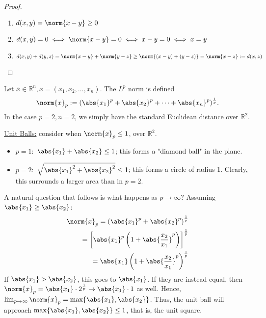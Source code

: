 \begin{proof}
    \begin{enumerate}
        \item $d(x,y) = \norm{x - y} \geq 0$
        \item $d(x, y) = 0 \iff \norm{x - y} = 0 \iff x - y = 0 \iff x = y$
        \item $d(x, y) + d(y, z) = \norm{x - y} + \norm{y - z} \geq \norm{(x - y) + (y-z)} = \norm{x - z} := d(x, z)$
    \end{enumerate}
\end{proof}

\begin{example}
    Let $\overline{x} \in \mathbb{R}^n, x = (x_1, x_2, \dots, x_n)$. The $L^p$ norm is defined \[
    \norm{x}_p := (\abs{x_1}^p + \abs{x_2}^p + \cdots + \abs{x_n}^p)^{\frac{1}{p}}.    
    \]
    In the case $p = 2, n = 2$, we simply have the standard Euclidean distance over $\mathbb{R}^2$.

    \underline{Unit Balls:} consider when $\norm{x}_p \leq 1$, over $\mathbb{R}^2$.
    \begin{itemize}
        \item $p = 1:$ $\abs{x_1} + \abs{x_2} \leq 1$; this forms a "diamond ball" in the plane.
        \item $p = 2:$ $\sqrt{\abs{x_1}^{2}+\abs{x_2}^2} \leq 1$; this forms a circle of radius 1. Clearly, this surrounds a larger area than in $p =2$.
    \end{itemize}
    A natural question that follows is what happens as $p \to \infty$? Assuming $\abs{x_1} \geq \abs{x_2}$:
    \begin{align*}
        \norm{x}_p = \left(\abs{x_1}^p + \abs{x_2}^p\right)^{\frac{1}{p}}\\
        = \left[\abs{x_1}^p\left(1 + \abs{\frac{x_2}{x_1}}^p\right)\right]^{\frac{1}{p}}\\
        = \abs{x_1}\left(1 + \abs{\frac{x_2}{x_1}}^p\right)^{\frac{1}{p}}
    \end{align*}
    If $\abs{x_1} > \abs{x_2}$, this goes to $\abs{x_1}$. If they are instead equal, then $\norm{x}_p = \abs{x_1}\cdot 2^{\frac{1}{p}} \to \abs{x_1} \cdot 1$ as well. Hence, $\lim_{p \to \infty} \norm{x}_p = \max\{\abs{x_1}, \abs{x_2}\}$. Thus, the unit ball will approach $\max \{\abs{x_1}, \abs{x_2}\} \leq 1$, that is, the unit square.
\end{example}
